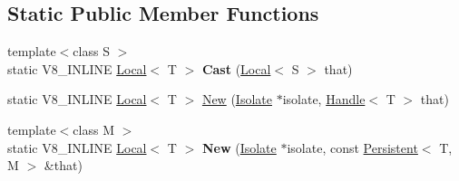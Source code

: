 \subsection*{Static Public Member Functions}
\begin{DoxyCompactItemize}
\item 
\hypertarget{classv8_1_1_local_a95c8aa28ad098dd160ddd8cb60377bd6}{}{\footnotesize template$<$class S $>$ }\\static V8\+\_\+\+I\+N\+L\+I\+N\+E \hyperlink{classv8_1_1_local}{Local}$<$ T $>$ {\bfseries Cast} (\hyperlink{classv8_1_1_local}{Local}$<$ S $>$ that)\label{classv8_1_1_local_a95c8aa28ad098dd160ddd8cb60377bd6}

\item 
static V8\+\_\+\+I\+N\+L\+I\+N\+E \hyperlink{classv8_1_1_local}{Local}$<$ T $>$ \hyperlink{classv8_1_1_local_ae718dd5d42264bfaa2b5a42616b6673e}{New} (\hyperlink{classv8_1_1_isolate}{Isolate} $\ast$isolate, \hyperlink{classv8_1_1_handle}{Handle}$<$ T $>$ that)
\item 
\hypertarget{classv8_1_1_local_a61ee31b64c909cc09367474edbad3c6c}{}{\footnotesize template$<$class M $>$ }\\static V8\+\_\+\+I\+N\+L\+I\+N\+E \hyperlink{classv8_1_1_local}{Local}$<$ T $>$ {\bfseries New} (\hyperlink{classv8_1_1_isolate}{Isolate} $\ast$isolate, const \hyperlink{classv8_1_1_persistent}{Persistent}$<$ T, M $>$ \&that)\label{classv8_1_1_local_a61ee31b64c909cc09367474edbad3c6c}

\end{DoxyCompactItemize}
